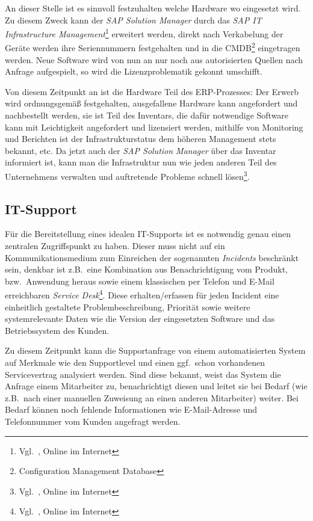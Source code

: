 An dieser Stelle ist es sinnvoll festzuhalten welche Hardware wo
eingesetzt wird.  Zu diesem Zweck kann der \emph{SAP Solution Manager}
durch das \emph{SAP IT Infrastructure
  Management}\footnote{Vgl.~\cite{SAP-IT-Realtech}, Online im
  Internet} erweitert werden, direkt nach Verkabelung der Geräte
werden ihre Seriennummern festgehalten und in die
CMDB\footnote{Configuration Management Database} eingetragen werden.
Neue Software wird von nun an nur noch aus autorisierten Quellen nach
Anfrage aufgespielt, so wird die Lizenzproblematik gekonnt umschifft.

Von diesem Zeitpunkt an ist die Hardware Teil des ERP-Prozesses: Der
Erwerb wird ordnungsgemäß festgehalten, ausgefallene Hardware kann
angefordert und nachbestellt werden, sie ist Teil des Inventars, die
dafür notwendige Software kann mit Leichtigkeit angefordert und
lizensiert werden, mithilfe von Monitoring und Berichten ist der
Infrastrukturstatus dem höheren Management stets bekannt, etc.  Da
jetzt auch der \emph{SAP Solution Manager} über das Inventar
informiert ist, kann man die Infrastruktur nun wie jeden anderen Teil
des Unternehmens verwalten und auftretende Probleme schnell
lösen\footnote{Vgl.~\cite{SAP-IT-Infrastructure-Management}, Online im
  Internet}.

\subsection{IT-Support}

Für die Bereitstellung eines idealen IT-Supports ist es notwendig
genau einen zentralen Zugriffspunkt zu haben.  Dieser muss nicht auf
ein Kommunikationsmedium zum Einreichen der sogenannten
\emph{Incidents} beschränkt sein, denkbar ist z.B.~eine Kombination
aus Benachrichtigung vom Produkt, bzw.~Anwendung heraus sowie einem
klassischen per Telefon und E-Mail erreichbaren \emph{Service
  Desk}\footnote{Vgl.~\cite{SAP-Service-Desk}, Online im Internet}.
Diese erhalten/erfassen für jeden Incident eine einheitlich gestaltete
Problembeschreibung, Priorität sowie weitere systemrelevante Daten wie
die Version der eingesetzten Software und das Betriebssystem des Kunden.

Zu diesem Zeitpunkt kann die Supportanfrage von einem automatisierten
System auf Merkmale wie den Supportlevel und einen ggf.~schon
vorhandenen Servicevertrag analysiert werden.  Sind diese bekannt,
weist das System die Anfrage einem Mitarbeiter zu, benachrichtigt
diesen und leitet sie bei Bedarf (wie z.B.~nach einer manuellen
Zuweisung an einen anderen Mitarbeiter) weiter.  Bei Bedarf können
noch fehlende Informationen wie E-Mail-Adresse und Telefonnummer vom
Kunden angefragt werden.

